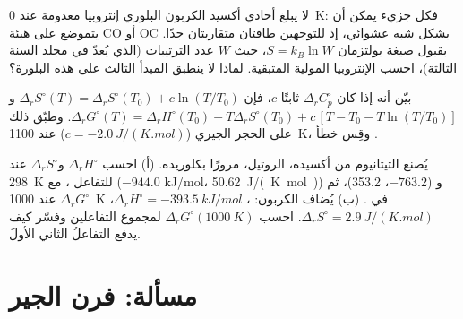 \begin{exercise}[$\star\star\star$]\label{exo:b2:reaction-free-energy:10}
لا يبلغ أحادي أكسيد الكربون البلوري إنتروبيا معدومة عند \qty{0}{K}: فكل
جزيء يمكن أن يتموضع على هيئة CO أو OC بشكل شبه عشوائي، إذ للتوجهين طاقتان
متقاربتان جدًا. بقبول صيغة بولتزمان $S = k_B\ln W$، حيث
$W$ عدد الترتيبات (الذي يُعدّ في مجلد السنة الثالثة)، احسب
الإنتروبيا المولية المتبقية. لماذا لا ينطبق المبدأ الثالث على هذه
البلورة؟
\end{exercise}

\begin{exercise}[$\star\star\star$]\label{exo:b2:reaction-free-energy:11}
بيّن أنه إذا كان $\Delta_r C^\circ_p$ ثابتًا $c$، فإن
$\Delta_r S^\circ(T) = \Delta_r S^\circ(T_0) + c\ln(T/T_0)$ 
و$\Delta_r G^\circ(T) = \Delta_r H^\circ(T_0) - T\Delta_r S^\circ(T_0) +
c\,[T - T_0 - T\ln(T/T_0)]$. وطبّق ذلك على الحجر الجيري ($c =
\qty{-2.0}{J/(K.mol)}$) عند \qty{1100}{K}، وقِس خطأ
.
\end{exercise}

\begin{exercise}[$\star\star\star$]\label{exo:b2:reaction-free-energy:12}
يُصنع التيتانيوم من أكسيده، الروتيل، مرورًا بكلوريده. (أ) احسب
$\Delta_r H^\circ$ و$\Delta_r S^\circ$ عند \qty{298}{K} للتفاعل ، مع  ($-944.0$ \unit{kJ/mol}،
\qty{50.62}{J/(K.mol)}) و ($-763.2$، 353.2)، ثم
$\Delta_r G^\circ$ عند \qty{1000}{K} في .
(ب) يُضاف الكربون: ، $\Delta_r H^\circ =
\qty{-393.5}{kJ/mol}$، $\Delta_r S^\circ = \qty{+2.9}{J/(K.mol)}$. احسب
$\Delta_r G^\circ(\qty{1000}{K})$ لمجموع التفاعلين وفسّر كيف يدفع
التفاعلُ الثاني الأولَ.
\end{exercise}

\section{مسألة: فرن الجير}

